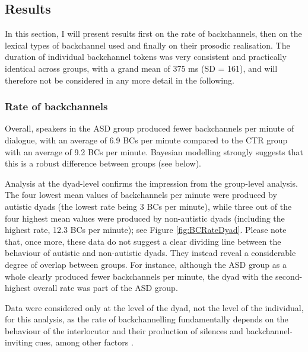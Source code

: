 \subsection{Results}\label{BCFP_BC_results}

In this section, I will present results first on the rate of backchannels, then on the lexical types of backchannel used and finally on their prosodic realisation. The duration of individual backchannel tokens was very consistent and practically identical across groups, with a grand mean of 375 ms (SD = 161), and will therefore not be considered in any more detail in the following.

\subsubsection{Rate of backchannels}\label{BCFP_BC_results_BCRate}


Overall, speakers in the ASD group produced fewer backchannels per minute of dialogue, with an average of 6.9 BCs per minute compared to the CTR group with an average of 9.2 BCs per minute. Bayesian modelling strongly suggests that this is a robust difference between groups (see below).

Analysis at the dyad-level confirms the impression from the group-level analysis. The four lowest mean values of backchannels per minute were produced by autistic dyads (the lowest rate being 3 BCs per minute), while three out of the four highest mean values were produced by non-autistic dyads (including the highest rate, 12.3 BCs per minute); see Figure \ref{fig:BCRateDyad}. Please note that, once more, these data do not suggest a clear dividing line between the behaviour of autistic and non-autistic dyads. They instead reveal a considerable degree of overlap between groups. For instance, although the ASD group as a whole clearly produced fewer backchannels per minute, the dyad with the second-highest overall rate was part of the ASD group.

Data were considered only at the level of the dyad, not the level of the individual, for this analysis, as the rate of backchannelling fundamentally depends on the behaviour of the interlocutor and their production of silences and backchan\-nel-inviting cues, among other factors \citep[and because interlocutors should not be treated as independent by default due to factors such as accommodation to the conversational partner; see e.g. results in  and][]{winterIndependenceGeneralizabilityLinguistics2021}.



